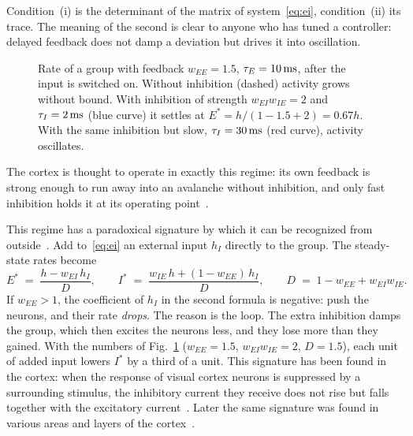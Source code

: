 Condition~(i) is the determinant of the matrix of system~\eqref{eq:ei}, condition~(ii) its trace. The meaning of the second is clear to anyone who has tuned a controller: delayed feedback does not damp a deviation but drives it into oscillation.

\begin{figure}[t]
\centering
{}
\caption{Rate of a  group with feedback $w_{EE}=1.5$, $\tau_E=10\,\text{ms}$, after the input is switched on. Without inhibition (dashed) activity grows without bound. With inhibition of strength $w_{EI}w_{IE}=2$ and $\tau_I=2\,\text{ms}$ (blue curve) it settles at $E^*=h/(1-1.5+2)=0.67h$. With the same inhibition but slow, $\tau_I=30\,\text{ms}$ (red curve), activity oscillates.}
\label{fig:ei}
\end{figure}

The cortex is thought to operate in exactly this regime: its own feedback is strong enough to run away into an avalanche without inhibition, and only fast inhibition holds it at its operating point~\cite{Tsodyks1997isn}.

This regime has a paradoxical signature by which it can be recognized from outside~\cite{Tsodyks1997isn}. Add to~\eqref{eq:ei} an external input $h_I$ directly to the  group. The steady-state rates become
\begin{equation}
E^* \;=\; \frac{h-w_{EI}\,h_I}{D},\qquad
I^* \;=\; \frac{w_{IE}\,h+(1-w_{EE})\,h_I}{D},\qquad
D \;=\; 1-w_{EE}+w_{EI}w_{IE} .
\label{eq:isn}
\end{equation}
If $w_{EE}>1$, the coefficient of $h_I$ in the second formula is negative: push the  neurons, and their rate \emph{drops}. The reason is the loop. The extra inhibition damps the  group, which then excites the  neurons less, and they lose more than they gained. With the numbers of Fig.~\ref{fig:ei} ($w_{EE}=1.5$, $w_{EI}w_{IE}=2$, $D=1.5$), each unit of added input lowers $I^*$ by a third of a unit. This signature has been found in the cortex: when the response of visual cortex neurons is suppressed by a surrounding stimulus, the inhibitory current they receive does not rise but falls together with the excitatory current~\cite{Ozeki2009}. Later the same signature was found in various areas and layers of the cortex~\cite{Sanzeni2020}.

